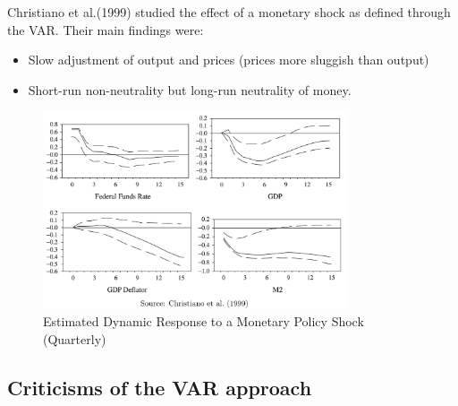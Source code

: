 Christiano et al.(1999\cite{christiano1999monetary}) studied the effect of a monetary shock as defined through the VAR.
Their main findings were:
\begin{itemize}
    \item Slow adjustment of output and prices (prices more sluggish
    than output)
    \item Short-run non-neutrality but long-run neutrality of money.
\end{itemize}
\begin{figure}[!htbp]
    \centering
    \includegraphics[width=0.8\textwidth]{figures/christiano1999.png}
    \caption{Estimated Dynamic Response to a Monetary Policy Shock (Quarterly)}
    \label{fig:christiano1999}
\end{figure}

\subsection{Criticisms of the VAR approach}

